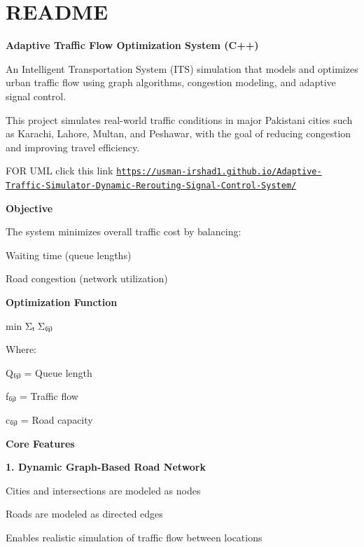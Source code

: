 \chapter{README }
\hypertarget{md__r_e_a_d_m_e}{}\label{md__r_e_a_d_m_e}
{\bfseries{Adaptive Traffic Flow Optimization System (C++)}}

An Intelligent Transportation System (ITS) simulation that models and optimizes urban traffic flow using graph algorithms, congestion modeling, and adaptive signal control.

This project simulates real-\/world traffic conditions in major Pakistani cities such as Karachi, Lahore, Multan, and Peshawar, with the goal of reducing congestion and improving travel efficiency.

FOR UML click this link \href{https://usman-irshad1.github.io/Adaptive-Traffic-Simulator-Dynamic-Rerouting-Signal-Control-System/}{\texttt{https:\+/\+/\+usman-\/irshad1.\+github.\+io/\+\+Adaptive-\/\+Traffic-\/\+Simulator-\/\+Dynamic-\/\+Rerouting-\/\+Signal-\/\+Control-\/\+System/\+}}

{\bfseries{Objective}}

The system minimizes overall traffic cost by balancing:\+


\begin{DoxyItemize}
\item Waiting time (queue lengths)
\item Road congestion (network utilization)
\end{DoxyItemize}

{\bfseries{Optimization Function}}

min Σₜ Σ₍ᵢⱼ₎ \+[ α Q₍ᵢⱼ₎(t) + β (f₍ᵢⱼ₎(t) /\+ c₍ᵢⱼ₎)² ]\+

Where:\+

Q₍ᵢⱼ₎ = Queue length

f₍ᵢⱼ₎ = Traffic flow

c₍ᵢⱼ₎ = Road capacity

{\bfseries{Core Features}}

{\bfseries{1. Dynamic Graph-\/\+Based Road Network}}


\begin{DoxyItemize}
\item Cities and intersections are modeled as nodes
\item Roads are modeled as directed edges
\item Enables realistic simulation of traffic flow between locations
\end{DoxyItemize}

